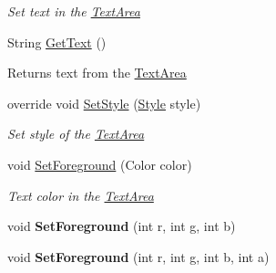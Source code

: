 \begin{DoxyCompactItemize}
\begin{DoxyCompactList}\small\item\em Set text in the \mbox{\hyperlink{class_space_v_i_l_1_1_text_area}{Text\+Area}} \end{DoxyCompactList}\item 
\mbox{\label{class_space_v_i_l_1_1_text_area_ac05ac1c354666ec6c88643c430072587}} 
String \mbox{\hyperlink{class_space_v_i_l_1_1_text_area_ac05ac1c354666ec6c88643c430072587}{Get\+Text}} ()
\begin{DoxyCompactList}\small\item\em \begin{DoxyReturn}{Returns}
text from the \mbox{\hyperlink{class_space_v_i_l_1_1_text_area}{Text\+Area}} 
\end{DoxyReturn}
\end{DoxyCompactList}\item 
override void \mbox{\hyperlink{class_space_v_i_l_1_1_text_area_a348d8c59439854876e894867fea7c7c1}{Set\+Style}} (\mbox{\hyperlink{class_space_v_i_l_1_1_decorations_1_1_style}{Style}} style)
\begin{DoxyCompactList}\small\item\em Set style of the \mbox{\hyperlink{class_space_v_i_l_1_1_text_area}{Text\+Area}} \end{DoxyCompactList}\item 
void \mbox{\hyperlink{class_space_v_i_l_1_1_text_area_aa9c6056e93687169789b8631759dd7f2}{Set\+Foreground}} (Color color)
\begin{DoxyCompactList}\small\item\em Text color in the \mbox{\hyperlink{class_space_v_i_l_1_1_text_area}{Text\+Area}} \end{DoxyCompactList}\item 
\mbox{\label{class_space_v_i_l_1_1_text_area_ace35298bf7fb9cde027c38750368fcfb}} 
void {\bfseries Set\+Foreground} (int r, int g, int b)
\item 
\mbox{\label{class_space_v_i_l_1_1_text_area_a0a8bbdfbcc7553cbfb7ca51e5b7d2878}} 
void {\bfseries Set\+Foreground} (int r, int g, int b, int a)
\item 
\mbox{\label{class_space_v_i_l_1_1_text_area_a94e6ee39955acd614f353c6c8df3b7d1}} 

\end{DoxyCompactItemize}
